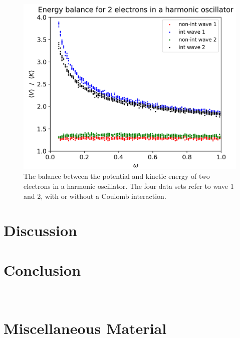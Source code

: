 \documentclass[nofootinbib,reprint,english]{revtex4-1}
\begin{document}
\begin{figure}
\centering
\includegraphics[scale=0.5]{../results/virial/energy_balance_2.png}
\caption{The balance between the potential and kinetic energy of two electrons in a harmonic oscillator. The four data sets refer to wave 1 and 2, with or without a Coulomb interaction.}\label{fig:virial}
\end{figure}



\section{Discussion}

\section{Conclusion}

%
%


~
\clearpage
\appendix

\onecolumngrid
\section{Miscellaneous Material}\label{app:misc_material}
\end{document}
